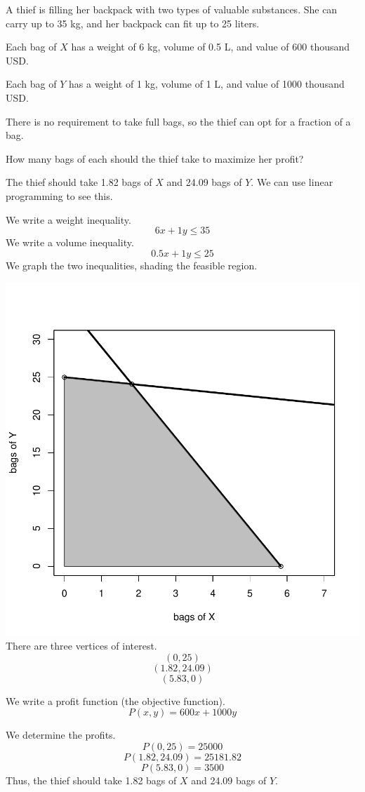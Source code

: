 
\begin{question}
A thief is filling her backpack with two types of valuable substances.
She can carry up to 35 kg, and her backpack can fit up to 25 liters.

Each bag of \(X\) has a weight of 6 kg, volume of 0.5 L, and value of
600 thousand USD.

Each bag of \(Y\) has a weight of 1 kg, volume of 1 L, and value of 1000
thousand USD.

There is no requirement to take full bags, so the thief can opt for a
fraction of a bag.

How many bags of each should the thief take to maximize her profit?
\end{question}

\begin{solution}
The thief should take 1.82 bags of \(X\) and 24.09 bags of \(Y\). We can
use linear programming to see this.

We write a weight inequality. \[6x+1y \le 35\] We write a volume
inequality. \[0.5x+1y \le 25\] We graph the two inequalities, shading
the feasible region.

\includegraphics{unnamed-chunk-1-1-6.pdf}\\

There are three vertices of interest. \[(0,25) \] \[(1.82,24.09) \]
\[(5.83,0)\]

We write a profit function (the objective function).
\[P(x,y) = 600x+1000y \]

We determine the profits. \[P(0,25)=25000 \] \[P(1.82,24.09)=25181.82 \]
\[P(5.83,0)=3500 \] Thus, the thief should take 1.82 bags of \(X\) and
24.09 bags of \(Y\).
\end{solution}

